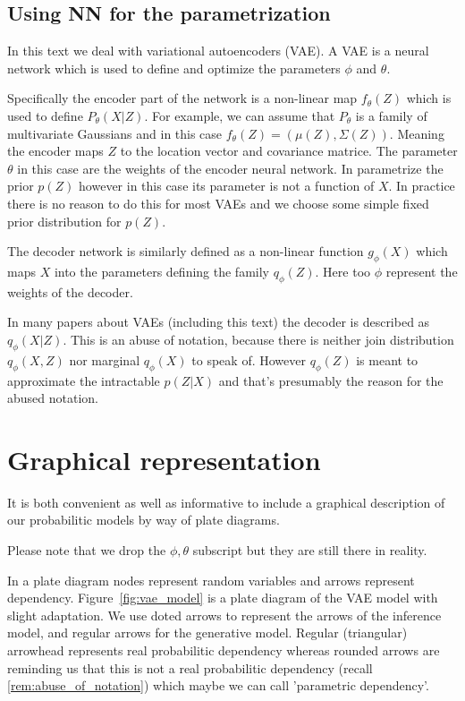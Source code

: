 \documentclass[11pt, a4paper]{report}
\theoremstyle{plain}
\theoremstyle{definition}
\theoremstyle{remark}
\begin{document}
\subsection{Using NN for the parametrization}
In this text we deal with variational autoencoders (VAE).
A VAE is a neural network which is used to define and optimize the parameters
$\phi$ and $\theta$.

Specifically the encoder part of the network is a non-linear map $f_{\theta}(Z)$ which is
used to define $P_{\theta}(X|Z)$. For example, we can assume that $P_{\theta}$
is a family of multivariate Gaussians and in this case $f_{\theta}(Z) =
(\mu(Z), \Sigma(Z))$. Meaning the encoder maps $Z$ to the location vector and
covariance matrice. The parameter $\theta$ in this case are the weights of the
encoder neural network. In parametrize the prior $p(Z)$ however in this case its
parameter is not a function of $X$. In practice there is no reason to do this
for most VAEs and we choose some simple fixed prior distribution for $p(Z)$.

The decoder network is similarly defined as a non-linear function $g_{\phi}(X)$ which
maps $X$ into the parameters defining the family $q_{\phi}(Z)$. Here too $\phi$
represent the weights of the decoder.

\remark{}\label{rem:abuse_of_notation}
In many papers about VAEs (including this text) the decoder is described as
$q_{\phi}(X | Z)$. This is an abuse of notation, because there is neither 
join distribution $q_{\phi}(X,Z)$ nor marginal $q_{\phi}(X)$ to speak of.
However $q_{\phi}(Z)$ is meant to approximate the intractable $p(Z|X)$ and
that's presumably the reason for the abused notation.


\section{Graphical representation}


It is both convenient as well as informative to include a graphical description
of our probabilitic models by way of plate diagrams.

Please note that we drop the $\phi, \theta$ subscript but they are still there
in reality.

In a plate diagram nodes represent random variables and arrows
represent dependency.
Figure~\ref{fig:vae_model} is a plate diagram of the VAE model with slight
adaptation. We use doted arrows to represent the arrows of the inference model,
and regular arrows for the generative model. Regular (triangular) arrowhead
represents real probabilitic dependency whereas rounded arrows are reminding us
that this is not a real probabilitic dependency (recall
\ref{rem:abuse_of_notation}) which maybe we can call 'parametric
dependency'.
\end{document}
